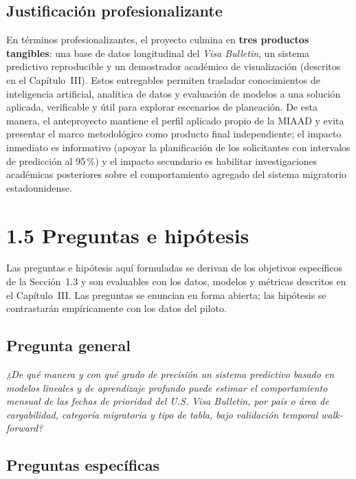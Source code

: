 \documentclass[12pt,letterpaper]{report}
\begin{document}
\subsection*{Justificación profesionalizante}

En términos profesionalizantes, el proyecto culmina en \textbf{tres productos tangibles}: una base de datos longitudinal del \textit{Visa Bulletin}, un sistema predictivo reproducible y un demostrador académico de visualización (descritos en el Capítulo~III). Estos entregables permiten trasladar conocimientos de inteligencia artificial, analítica de datos y evaluación de modelos a una solución aplicada, verificable y útil para explorar escenarios de planeación. De esta manera, el anteproyecto mantiene el perfil aplicado propio de la MIAAD y evita presentar el marco metodológico como producto final independiente; el impacto inmediato es informativo (apoyar la planificación de los solicitantes con intervalos de predicción al 95\,\%) y el impacto secundario es habilitar investigaciones académicas posteriores sobre el comportamiento agregado del sistema migratorio estadounidense.

\clearpage

\section{1.5 Preguntas e hipótesis}

Las preguntas e hipótesis aquí formuladas se derivan de los objetivos específicos de la Sección~1.3 y son evaluables con los datos, modelos y métricas descritos en el Capítulo~III. Las preguntas se enuncian en forma abierta; las hipótesis se contrastarán empíricamente con los datos del piloto.

\subsection*{Pregunta general}

\textit{¿De qué manera y con qué grado de precisión un sistema predictivo basado en modelos lineales y de aprendizaje profundo puede estimar el comportamiento mensual de las fechas de prioridad del \textit{U.S. Visa Bulletin}, por país o área de cargabilidad, categoría migratoria y tipo de tabla, bajo validación temporal \textit{walk-forward}?}

\subsection*{Preguntas específicas}
\end{document}
